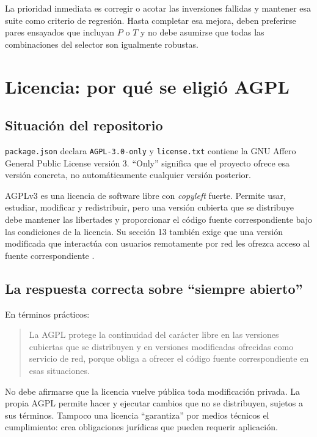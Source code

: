 \documentclass[11pt,a4paper,oneside]{article}
\newcommand{\code}[1]{\texttt{#1}}
\begin{document}
La prioridad inmediata es corregir o acotar las inversiones fallidas y mantener esa suite como criterio de regresi\'on. Hasta completar esa mejora, deben preferirse pares ensayados que incluyan $P$ o $T$ y no debe asumirse que todas las combinaciones del selector son igualmente robustas.

\section{Licencia: por qu\'e se eligi\'o AGPL}

\subsection{Situaci\'on del repositorio}

\code{package.json} declara \code{AGPL-3.0-only} y \code{license.txt} contiene la GNU Affero General Public License versi\'on 3. ``Only'' significa que el proyecto ofrece esa versi\'on concreta, no autom\'aticamente cualquier versi\'on posterior.

AGPLv3 es una licencia de software libre con \emph{copyleft} fuerte. Permite usar, estudiar, modificar y redistribuir, pero una versi\'on cubierta que se distribuye debe mantener las libertades y proporcionar el c\'odigo fuente correspondiente bajo las condiciones de la licencia. Su secci\'on 13 tambi\'en exige que una versi\'on modificada que interact\'ua con usuarios remotamente por red les ofrezca acceso al fuente correspondiente \cite{agpl}.

\subsection{La respuesta correcta sobre ``siempre abierto''}

En t\'erminos pr\'acticos:

\begin{quote}
La AGPL protege la continuidad del car\'acter libre en las versiones cubiertas que se distribuyen y en versiones modificadas ofrecidas como servicio de red, porque obliga a ofrecer el c\'odigo fuente correspondiente en esas situaciones.
\end{quote}

No debe afirmarse que la licencia vuelve p\'ublica toda modificaci\'on privada. La propia AGPL permite hacer y ejecutar cambios que no se distribuyen, sujetos a sus t\'erminos. Tampoco una licencia ``garantiza'' por medios t\'ecnicos el cumplimiento: crea obligaciones jur\'idicas que pueden requerir aplicaci\'on.
\end{document}
